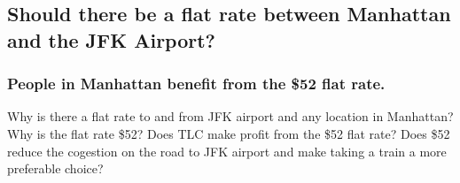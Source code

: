 \documentclass[12pt,twoside]{reedthesis}
\theoremstyle{definition}
\theoremstyle{definition}
\theoremstyle{definition}
\theoremstyle{remark}
\begin{document}
\subsection{Should there be a flat rate between Manhattan and the JFK
Airport?}\label{should-there-be-a-flat-rate-between-manhattan-and-the-jfk-airport}

\subsubsection{People in Manhattan benefit from the \$52 flat
rate.}\label{people-in-manhattan-benefit-from-the-52-flat-rate.}

Why is there a flat rate to and from JFK airport and any location in
Manhattan? Why is the flat rate \$52? Does TLC make profit from the \$52
flat rate? Does \$52 reduce the cogestion on the road to JFK airport and
make taking a train a more preferable choice?
\end{document}
